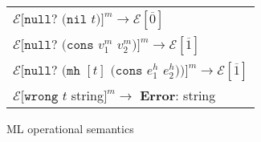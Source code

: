 \begin{figure}[p]
\begin{tabular}{l}
$\mathscr{E}[\mathtt{null?}$ $(\mathtt{nil}$ $t)]^m\rightarrow\mathscr{E}[\overline{0}]$ \\

$\mathscr{E}[\mathtt{null?}$ $(\mathtt{cons}$ $v^m_1$ $v^m_2)]^m\rightarrow\mathscr{E}[\overline{1}]$ \\

$\mathscr{E}[\mathtt{null?}$ $(\mathtt{mh}$ $[t]$ $(\mathtt{cons}$ $e^h_1$ $e^h_2))]^m\rightarrow\mathscr{E}[\overline{1}]$ \\

$\mathscr{E}[\mathtt{wrong}$ $t$ string$]^m\rightarrow$ \textbf{Error}: string

\end{tabular}
\caption{ML operational semantics}
\label{mos}
\end{figure}